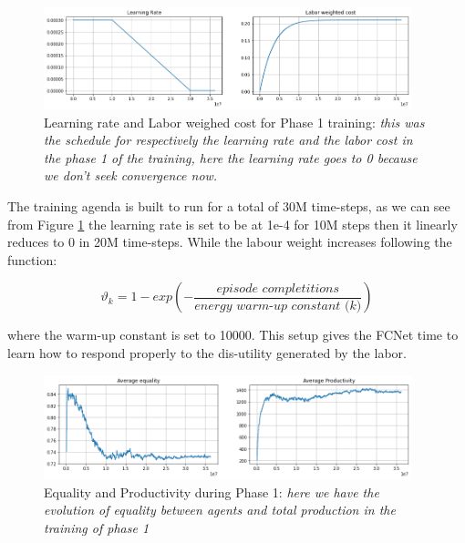 \begin{figure}[h!]
    \centering
    \linespread{.9} 
    \includegraphics[width=0.95\textwidth]{Resources/imgs/LR_phase1.png}
    \caption[Learning rate and Labor weighed cost for Phase 1 training: ]%
    {\label{img:lr_phase0}Learning rate and Labor weighed cost for Phase 1 training: \small \textit{this was the schedule for respectively the learning rate and the labor cost in the phase 1 of the training, here the learning rate goes to 0 because we don't seek convergence now.}}
\end{figure}

The training agenda is built to run for a total of 30M time-steps, as we can see from Figure \ref{img:lr_phase0} the learning rate is set to be at 1e-4 for 10M steps then it linearly reduces to 0 in 20M time-steps. While the labour weight increases following the function:

\begin{equation}
    \vartheta_k = 1- exp\left(- \frac{\textit{episode completitions}}{\textit{energy warm-up constant (k)}}\right)
\end{equation}

where the warm-up constant is set to 10000. This setup gives the FCNet time to learn how to respond properly to the dis-utility generated by the labor. 



\begin{figure}[h!]
    \centering
    \linespread{.9} 
    \includegraphics[width=0.95\textwidth]{Resources/imgs/FCNET_prod_phase1.png}
    \caption[Equality and Productivity during Phase 1:  ]%
    {\label{img:prod_phase0}Equality and Productivity during Phase 1: \small \textit{here we have the evolution of equality between agents and total production in the training of phase 1}}
\end{figure}



